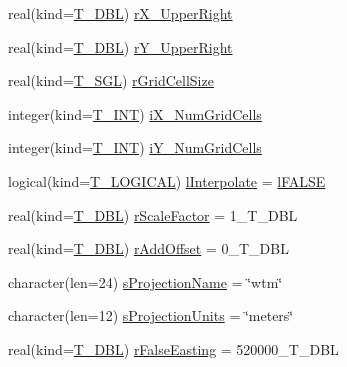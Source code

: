 \begin{DoxyCompactItemize}
\item 
real(kind=\hyperlink{namespacetypes_a888737411068474a167b1c3e5b579c58}{T\_\-DBL}) \hyperlink{typetypes_1_1_t___n_e_t_c_d_f___f_i_l_e_a39a27d9d3b76e663b97c00ee39d11201}{rX\_\-UpperRight}
\item 
real(kind=\hyperlink{namespacetypes_a888737411068474a167b1c3e5b579c58}{T\_\-DBL}) \hyperlink{typetypes_1_1_t___n_e_t_c_d_f___f_i_l_e_a96cb708cc219e3f383fa55c6b6b46c37}{rY\_\-UpperRight}
\item 
real(kind=\hyperlink{namespacetypes_af3012489af4c138f271f1bce244b7e51}{T\_\-SGL}) \hyperlink{typetypes_1_1_t___n_e_t_c_d_f___f_i_l_e_a52fa78589f7bd55ad7aa5fe2e5cc8e74}{rGridCellSize}
\item 
integer(kind=\hyperlink{namespacetypes_a4e4d040a4425196c4d43be63e7e6103a}{T\_\-INT}) \hyperlink{typetypes_1_1_t___n_e_t_c_d_f___f_i_l_e_a4a35d4953112a534078fc3eacb53ce69}{iX\_\-NumGridCells}
\item 
integer(kind=\hyperlink{namespacetypes_a4e4d040a4425196c4d43be63e7e6103a}{T\_\-INT}) \hyperlink{typetypes_1_1_t___n_e_t_c_d_f___f_i_l_e_ace63e40f95572e1ff3359e428d012766}{iY\_\-NumGridCells}
\item 
logical(kind=\hyperlink{namespacetypes_adfa8f4f6096bb7bdbb93f36b911dcaad}{T\_\-LOGICAL}) \hyperlink{typetypes_1_1_t___n_e_t_c_d_f___f_i_l_e_a7954e4a70d839ef6181f397ecd48591e}{lInterpolate} = \hyperlink{namespacetypes_ad09a27b431e0fad201524039e6943e5b}{lFALSE}
\item 
real(kind=\hyperlink{namespacetypes_a888737411068474a167b1c3e5b579c58}{T\_\-DBL}) \hyperlink{typetypes_1_1_t___n_e_t_c_d_f___f_i_l_e_a9c744d504c0b7bcf63ea841a461e6c3d}{rScaleFactor} = 1\_\-T\_\-DBL
\item 
real(kind=\hyperlink{namespacetypes_a888737411068474a167b1c3e5b579c58}{T\_\-DBL}) \hyperlink{typetypes_1_1_t___n_e_t_c_d_f___f_i_l_e_a16488bc447262fc886c50892ec58dcd0}{rAddOffset} = 0\_\-T\_\-DBL
\item 
character(len=24) \hyperlink{typetypes_1_1_t___n_e_t_c_d_f___f_i_l_e_a06334fa90a138c43e3faf006c12760a3}{sProjectionName} = \char`\"{}wtm\char`\"{}
\item 
character(len=12) \hyperlink{typetypes_1_1_t___n_e_t_c_d_f___f_i_l_e_a493da74bc251dd8a957ab31f0c2cfdc9}{sProjectionUnits} = \char`\"{}meters\char`\"{}
\item 
real(kind=\hyperlink{namespacetypes_a888737411068474a167b1c3e5b579c58}{T\_\-DBL}) \hyperlink{typetypes_1_1_t___n_e_t_c_d_f___f_i_l_e_a0adfbddbcbca82f0762c5413b309cf75}{rFalseEasting} = 520000\_\-T\_\-DBL

\end{DoxyCompactItemize}
